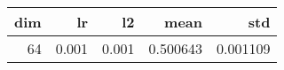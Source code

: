 \begin{tabular}{rrrrr}
\toprule
 dim &     lr &     l2 &      mean &       std \\
\midrule
  64 &  0.001 &  0.001 &  0.500643 &  0.001109 \\
\bottomrule
\end{tabular}
